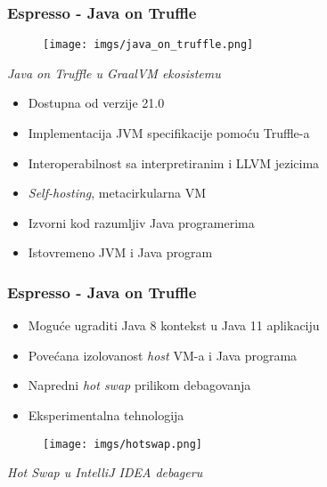 \documentclass{beamer}
\begin{document}
	\begin{frame}
		\frametitle{Espresso - Java on Truffle}

		\begin{figure}
			\begin{center}
				\texttt{[image: imgs/java\_on\_truffle.png]}	
			\end{center} 
		\end{figure}

		\center	
		\textit{Java on Truffle u GraalVM ekosistemu}


		\begin{flushleft}
			\begin{itemize}
				\item Dostupna od verzije 21.0
				\item Implementacija JVM specifikacije pomoću Truffle-a
				\item Interoperabilnost sa interpretiranim i LLVM jezicima
				\item \emph{Self-hosting}, metacirkularna VM
				\item Izvorni kod razumljiv Java programerima
				\item Istovremeno JVM i Java program
			\end{itemize}
		\end{flushleft}

	\end{frame}	

	\begin{frame}
		\frametitle{Espresso - Java on Truffle}

		\begin{flushleft}
			\begin{itemize}
				\item Moguće ugraditi Java 8 kontekst u Java 11 aplikaciju
				\item Povećana izolovanost \emph{host} VM-a i Java programa
				\item Napredni \emph{hot swap} prilikom debagovanja
				\item Eksperimentalna tehnologija
			\end{itemize}
		\end{flushleft}


		\begin{figure}
			\begin{center}
				\texttt{[image: imgs/hotswap.png]}	
			\end{center} 
		\end{figure}

		\center	
		\textit{Hot Swap u IntelliJ IDEA debageru}

	\end{frame}
	
\end{document}
